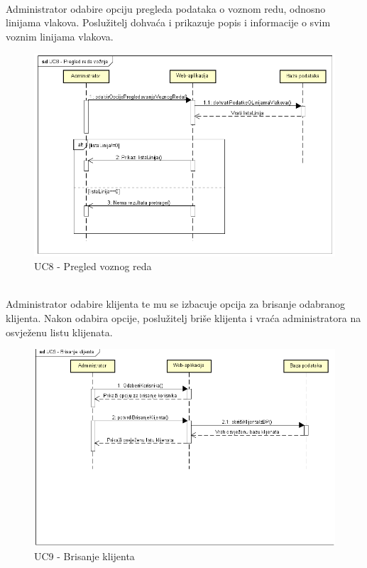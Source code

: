 				\noindent {}\\
				{Administrator odabire opciju pregleda podataka o voznom redu, odnosno linijama vlakova. Poslužitelj dohvaća i prikazuje popis i informacije o svim voznim linijama vlakova.}\\
				
				\begin{figure}[H]
					\centering
					\includegraphics[width=1\linewidth]{"slike/UC8-sekvencijski"}
					\caption{UC8 - Pregled voznog reda}
					\label{fig:UC-pregled-voznog-reda}
				\end{figure}

				\noindent {}\\
				{Administrator odabire klijenta te mu se izbacuje opcija za brisanje odabranog klijenta. Nakon odabira opcije, poslužitelj briše klijenta i vraća administratora na osvježenu listu klijenata.}\\
				
				\begin{figure}[H]
					\centering
					\includegraphics[width=1\linewidth]{"slike/UC9-sekvencijski"}
					\caption{UC9 - Brisanje klijenta}
					\label{fig:UC-brisanje-klijenta}
				\end{figure}

